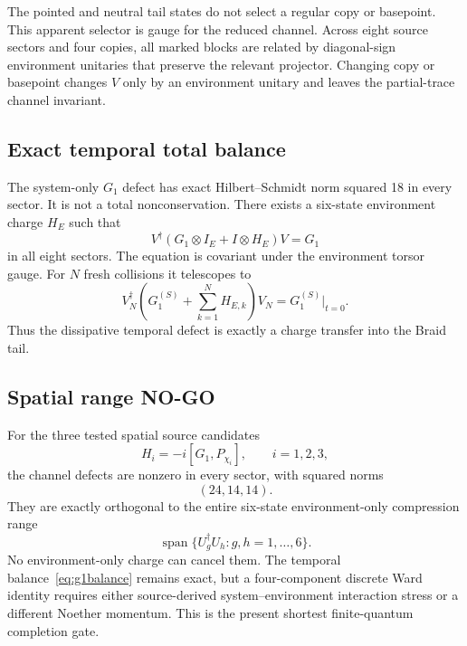 \documentclass[11pt]{article}
\theoremstyle{definition}
\theoremstyle{remark}
\begin{document}
The pointed and neutral tail states do not select a regular copy or basepoint. This apparent selector is gauge for the reduced channel. Across eight source sectors and four copies, all marked blocks are related by diagonal-sign environment unitaries that preserve the relevant projector. Changing copy or basepoint changes $V$ only by an environment unitary and leaves the partial-trace channel invariant.

\subsection{Exact temporal total balance}

The system-only $G_1$ defect has exact Hilbert--Schmidt norm squared 18 in every sector. It is not a total nonconservation. There exists a six-state environment charge $H_E$ such that
\begin{equation}\label{eq:g1balance}
 V^{\dagger}(G_1\otimes I_E+I\otimes H_E)V=G_1
\end{equation}
in all eight sectors. The equation is covariant under the environment torsor gauge. For $N$ fresh collisions it telescopes to
\begin{equation}\label{eq:telescope}
 V_N^{\dagger}\left(G_1^{(S)}+\sum_{k=1}^{N}H_{E,k}\right)V_N
 =G_1^{(S)}\big|_{t=0}.
\end{equation}
Thus the dissipative temporal defect is exactly a charge transfer into the Braid tail.

\subsection{Spatial range NO-GO}

For the three tested spatial source candidates
\begin{equation}
 H_i=-i[G_1,P_{\chi_i}],\qquad i=1,2,3,
\end{equation}
the channel defects are nonzero in every sector, with squared norms
\begin{equation}
 (24,14,14).
\end{equation}
They are exactly orthogonal to the entire six-state environment-only compression range
\begin{equation}
 \operatorname{span}\{U_g^{\dagger}U_h:g,h=1,\ldots,6\}.
\end{equation}
No environment-only charge can cancel them. The temporal balance~\eqref{eq:g1balance} remains exact, but a four-component discrete Ward identity requires either source-derived system--environment interaction stress or a different Noether momentum. This is the present shortest finite-quantum completion gate.
\end{document}
